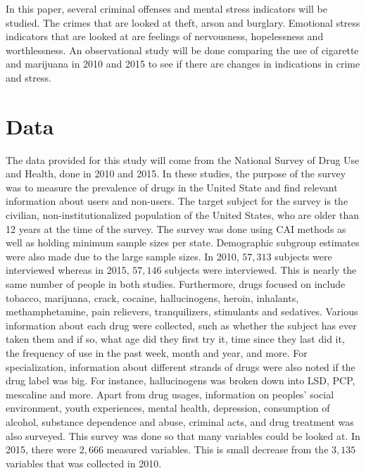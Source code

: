 \documentclass[a4paper, 10pt, conference]{ieeeconf}      %
\begin{document}
In this paper, several criminal offenses and mental stress indicators will be studied. The crimes that are looked at theft, arson and burglary. Emotional stress indicators that are looked at are feelings of nervousness, hopelessness and worthlessness. An observational study will be done comparing the use of cigarette and marijuana in 2010 and 2015 to see if there are changes in indications in crime and stress. 


\section{Data}

The data provided for this study will come from the National Survey of Drug Use and Health, done in 2010 and 2015. In these studies, the purpose of the survey was to measure the prevalence of drugs in the United State and find relevant information about users and non-users. The target subject for the survey is the civilian, non-institutionalized population of the United States, who are older than 12 years at the time of the survey. The survey was done using CAI methods as well as holding minimum sample sizes per state. Demographic subgroup estimates were also made due to the large sample sizes. In 2010, $57, 313$ subjects were interviewed whereas in 2015, $57,146$ subjects were interviewed. This is nearly the same number of people in both studies. Furthermore, drugs focused on include tobacco, marijuana, crack, cocaine, hallucinogens, heroin, inhalants, methamphetamine, pain relievers, tranquilizers, stimulants and sedatives. Various information about each drug were collected, such as whether the subject has ever taken them and if so, what age did they first try it, time since they last did it, the frequency of use in the past week, month and year, and more. For specialization, information about different strands of drugs were also noted if the drug label was big. For instance, hallucinogens was broken down into LSD, PCP, mescaline and more. Apart from drug usages, information on peoples' social environment, youth experiences, mental health, depression, consumption of alcohol, substance dependence and abuse, criminal acts, and drug treatment was also surveyed. This survey was done so that many variables could be looked at. In 2015, there were $2,666$ measured variables. This is small decrease from the $3,135$ variables that was collected in 2010. 
\end{document}
